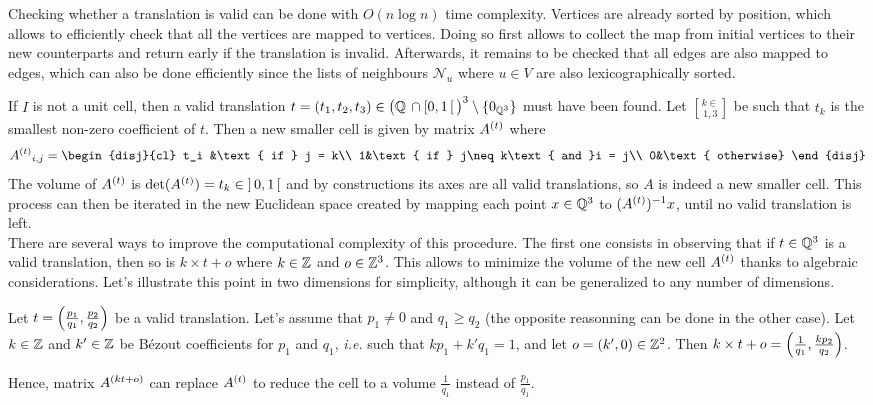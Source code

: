 \documentclass[main.tex]{subfiles}
\begin{document}
Checking whether a translation is valid can be done with $O(n\log n)$ time complexity. Vertices are already sorted by position, which allows to efficiently check that all the vertices are mapped to vertices. Doing so first allows to collect the map from initial vertices to their new counterparts and return early if the translation is invalid. Afterwards, it remains to be checked that all edges are also mapped to edges, which can also be done efficiently since the lists of neighbours $\mathcal N_u$ where $u\in V$ are also lexicographically sorted.

If $I$ is not a unit cell, then a valid translation $t = (t_1,t_2,t_3)\in\big(\mathbb{Q}\,\cap\left[0,1\,\right[\big)^3\setminus\{0_{\mathbb{Q}^3}\}$ must have been found. Let $k\in\brack{1,3}$ be such that $t_k$ is the smallest non-zero coefficient of $t$. Then a new smaller cell is given by matrix $A^{\left(t\right)}$ where
\[{\der At}_{i,j} = \begin{disj}{cl}
	t_i &\text{ if } j = k\\
	1&\text{ if } j\neq k\text{ and }i = j\\
	0&\text{ otherwise}
\end{disj}\]
The volume of $A^{\left(t\right)}$ is $\det(A^{\left(t\right)}) = t_k\in\left]\,0,1\,\right[$ and by constructions its axes are all valid translations, so $A$ is indeed a new smaller cell. This process can then be iterated in the new Euclidean space created by mapping each point $x\in\mathbb{Q}^3$ to $(A^{\left(t\right)})^{-1}x$, until no valid translation is left.\\

There are several ways to improve the computational complexity of this procedure. The first one consists in observing that if $t\in\mathbb{Q}^3$ is a valid translation, then so is $k\times t + o$ where $k\in\mathbb{Z}$ and $o\in\mathbb{Z}^3$. This allows to minimize the volume of the new cell $A^{\left(t\right)}$ thanks to algebraic considerations. Let's illustrate this point in two dimensions for simplicity, although it can be generalized to any number of dimensions.

Let $t =\left(\frac{p_1}{q_1}, \frac{p_2}{q_2}\right)$ be a valid translation. Let's assume that $p_1\neq0$ and $q_1 \ge q_2$ (the opposite reasonning can be done in the other case). Let $k\in\mathbb{Z}$ and $k'\in\mathbb{Z}$ be B\'{e}zout coefficients for $p_1$ and $q_1$, \textit{i.e.} such that $kp_1 + k'q_1 = 1$, and let $o = (k', 0)\in\mathbb{Z}^2$. Then $k\times t + o = \left(\frac1{q_1}, \frac{kp_2}{q_2}\right)$.

Hence, matrix $A^{\left(kt+o\right)}$ can replace $A^{\left(t\right)}$ to reduce the cell to a volume $\frac1{q_1}$ instead of $\frac{p_1}{q_1}$.\\
\end{document}

